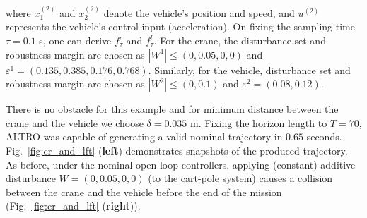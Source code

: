 where $x_1^{(2)}$ and $x_2^{(2)}$ denote the vehicle's position and speed, and $u^{(2)}$ represents the vehicle's control input (acceleration). 
On fixing the sampling time $\tau=0.1$ s, one can derive $f^c_\tau$ and $f^l_\tau$. For the crane, the disturbance set and robustness margin are chosen as $|W^1|\leq(0,0.05,0,0)$ and  $\varepsilon^{1}=(0.135,0.385,0.176 ,0.768)$. Similarly, for the vehicle, disturbance set and robustness margin are chosen as $|W^2|\leq(0,0.1)$ and $\varepsilon^{2}=(0.08,0.12)$.

There is no obstacle for this example and for minimum distance between the crane and the vehicle we choose $\delta=0.035$ m.
Fixing the horizon length to $T=70$, ALTRO was capable of generating a valid nominal trajectory in $0.65$ seconds. 
Fig.~\ref{fig:cr_and_lft} (\textbf{left}) demonstrates snapshots of the produced trajectory. 
As before, under the nominal open-loop controllers, applying (constant) additive disturbance $W=(0,0.05,0,0)$ (to the cart-pole system) 
causes a collision between the crane and the vehicle before the end of the mission (Fig.~\ref{fig:cr_and_lft} (\textbf{right})).

